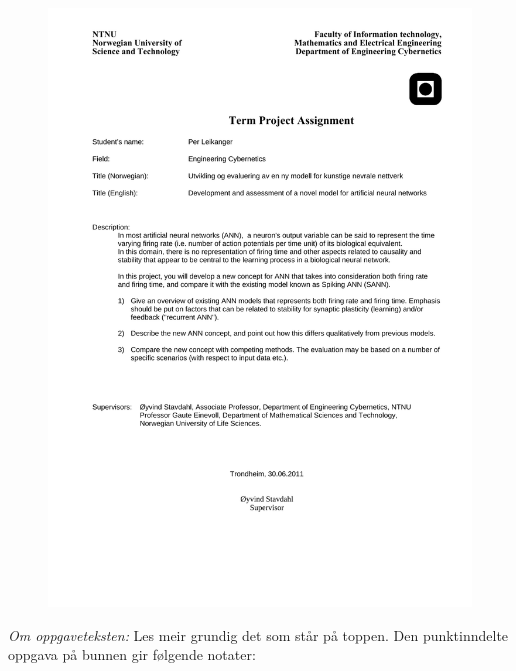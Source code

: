 \documentclass[b5paper,11 pt]{report}
\begin{document}
\begin{figure}[h!tbp]
        \centering
        \includegraphics[width=1.1\textwidth]{PerLeikanger-Oppgavetekst-engelsk.pdf}
\end{figure}



\emph{Om oppgaveteksten:}
Les meir grundig det som står på toppen. Den punktinndelte oppgava på bunnen gir følgende notater:
\end{document}
